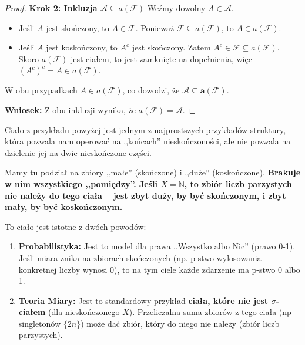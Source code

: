 \begin{proof}
\noindent \textbf{Krok 2: Inkluzja $\mathcal{A} \subseteq a(\mathcal{F})$} Weźmy dowolny $A \in \mathcal{A}$. 
\begin{itemize} 
	\item Jeśli $A$ jest skończony, to $A \in \mathcal{F}$. Ponieważ $\mathcal{F} \subseteq a(\mathcal{F})$, to $A \in a(\mathcal{F})$. 
	\item Jeśli $A$ jest koskończony, to $A^c$ jest skończony. Zatem $A^c \in \mathcal{F} \subseteq a(\mathcal{F})$. Skoro $a(\mathcal{F})$ jest ciałem, to jest zamknięte na dopełnienia, więc $(A^c)^c = A \in a(\mathcal{F})$. 
\end{itemize} 

W obu przypadkach $A \in a(\mathcal{F})$, co dowodzi, że $\bm{\mathcal{A} \subseteq a(\mathcal{F})}$. 

\noindent \textbf{Wniosek:} Z obu inkluzji wynika, że $a(\mathcal{F}) = \mathcal{A}$. 
\end{proof}
\begin{remark}
    Ciało z przykładu powyżej jest jednym z najprostszych przykładów struktury, która pozwala nam operować na ,,końcach'' nieskończoności, ale nie pozwala na dzielenie jej na dwie nieskończone części.
    
    Mamy tu podział na zbiory ,,małe'' (skończone) i ,,duże'' (koskończone). \textbf{Brakuje w nim wszystkiego ,,pomiędzy''. Jeśli $X=\mathbb{N}$, to zbiór liczb parzystych nie należy do tego ciała – jest zbyt duży, by być skończonym, i zbyt mały, by być koskończonym.}
    
    To ciało jest istotne z dwóch powodów:
    \begin{enumerate}
        \item \textbf{Probabilistyka:} Jest to model dla prawa ,,Wszystko albo Nic'' (prawo 0-1). Jeśli miara znika na zbiorach skończonych (np. p-stwo wylosowania konkretnej liczby wynosi 0), to na tym ciele każde zdarzenie ma p-stwo 0 albo 1.
        \item \textbf{Teoria Miary:} Jest to standardowy przykład \textbf{ciała, które nie jest $\sigma$-ciałem} (dla nieskończonego $X$). Przeliczalna suma zbiorów z tego ciała (np singletonów $\{2n\}$) może dać zbiór, który do niego nie należy (zbiór liczb parzystych).
    \end{enumerate}
\end{remark}

